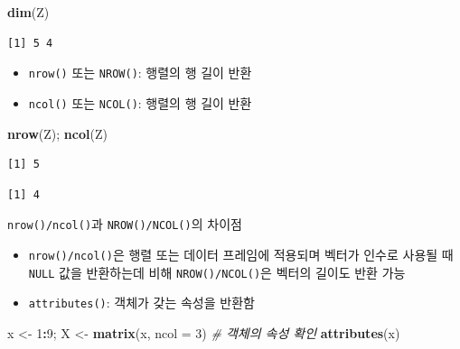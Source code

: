 \documentclass[
  11pt,
]{krantz}
\makeatletter
\newenvironment{Shaded}{\begin{snugshade}}{\end{snugshade}}
\newcommand{\CommentTok}[1]{\textcolor[rgb]{0.37,0.37,0.37}{\textit{#1}}}
\newcommand{\DataTypeTok}[1]{\textcolor[rgb]{0.27,0.27,0.27}{#1}}
\newcommand{\DecValTok}[1]{\textcolor[rgb]{0.06,0.06,0.06}{#1}}
\newcommand{\KeywordTok}[1]{\textcolor[rgb]{0.27,0.27,0.27}{\textbf{#1}}}
\newcommand{\NormalTok}[1]{#1}
\newcommand{\OperatorTok}[1]{\textcolor[rgb]{0.43,0.43,0.43}{\textbf{#1}}}
\newcommand{\StringTok}[1]{\textcolor[rgb]{0.5,0.5,0.5}{#1}}
\providecommand{\tightlist}{%
  \setlength{\itemsep}{0pt}\setlength{\parskip}{0pt}}
\newenvironment{kframe}{%
\medskip{}
\setlength{\fboxsep}{.8em}
 \def\at@end@of@kframe{}%
 \ifinner\ifhmode%
  \def\at@end@of@kframe{\end{minipage}}%
  \begin{minipage}{\columnwidth}%
 \fi\fi%
 \def\FrameCommand##1{\hskip\@totalleftmargin \hskip-\fboxsep
 \colorbox{shadecolor}{##1}\hskip-\fboxsep
     \hskip-\linewidth \hskip-\@totalleftmargin \hskip\columnwidth}%
 \MakeFramed {\advance\hsize-\width
   \@totalleftmargin\z@ \linewidth\hsize
   \@setminipage}}%
 {\par\unskip\endMakeFramed%
 \at@end@of@kframe}
\renewenvironment{quote}{\begin{kframe}}{\end{kframe}}
\makeatother
\begin{document}
\begin{Shaded}
\begin{Highlighting}[]
\KeywordTok{dim}\NormalTok{(Z)}
\end{Highlighting}
\end{Shaded}

\begin{verbatim}
[1] 5 4
\end{verbatim}

\normalsize

\begin{itemize}
\tightlist
\item
  \texttt{nrow()} 또는 \texttt{NROW()}: 행렬의 행 길이 반환
\item
  \texttt{ncol()} 또는 \texttt{NCOL()}: 행렬의 행 길이 반환
\end{itemize}

\footnotesize

\begin{Shaded}
\begin{Highlighting}[]
\KeywordTok{nrow}\NormalTok{(Z); }\KeywordTok{ncol}\NormalTok{(Z)}
\end{Highlighting}
\end{Shaded}

\begin{verbatim}
[1] 5
\end{verbatim}

\begin{verbatim}
[1] 4
\end{verbatim}

\normalsize

\begin{quote}
\texttt{nrow()/ncol()}과 \texttt{NROW()/NCOL()}의 차이점

\begin{itemize}
\tightlist
\item
  \texttt{nrow()/ncol()}은 행렬 또는 데이터 프레임에 적용되며 벡터가 인수로 사용될 때 \texttt{NULL} 값을 반환하는데 비해 \texttt{NROW()/NCOL()}은 벡터의 길이도 반환 가능
\end{itemize}
\end{quote}

\begin{itemize}
\tightlist
\item
  \texttt{attributes()}: 객체가 갖는 속성을 반환함
\end{itemize}

\footnotesize

\begin{Shaded}
\begin{Highlighting}[]
\NormalTok{x <-}\StringTok{ }\DecValTok{1}\OperatorTok{:}\DecValTok{9}\NormalTok{; X <-}\StringTok{ }\KeywordTok{matrix}\NormalTok{(x, }\DataTypeTok{ncol =} \DecValTok{3}\NormalTok{)}
\CommentTok{# 객체의 속성 확인}
\KeywordTok{attributes}\NormalTok{(x)}
\end{Highlighting}
\end{Shaded}
\end{document}
